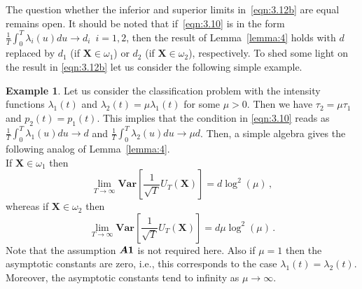 \documentclass[lettersize,journal,onecolumn]{IEEEtran}
\theoremstyle{definition}
\newtheorem{example}{Example}
\newcommand{\Var}[1]{\mathbf{Var}\left[#1\right]}
\newcommand{\assumption}[1]{{\rm \boldsymbol{A#1}}}
\begin{document}
The question whether the inferior and superior limits in~\eqref{eqn:3.12b} are equal
remains open. It should be noted that if~\eqref{eqn:3.10} is in the form \mbox{$
	\frac{1}{T}	\int_{0}^{T} \lambda_{i}(u)du \to d_{i}
	\enspace i=1,2
	$}, then the result of Lemma~\ref{lemma:4} holds with $d$ replaced by $d_{1}$
(if $\mathbf{X}\in\omega_{1}$) or $d_{2}$ (if $\mathbf{X}\in\omega_{2}$), respectively.
To shed some light on the result in \eqref{eqn:3.12b} let us consider the following
simple example.
\begin{example} 
	\label{example:1}
	Let us consider the classification problem with the intensity functions 
	$\lambda_1(t)$ and $\lambda_2(t) = \mu \lambda_1(t)$ for some $\mu > 0$. 
	Then we have $\tau_2 = \mu\tau_1$ and $p_2(t) = p_1(t)$. This implies that the 
	condition in \eqref{eqn:3.10} reads as \mbox{$
		\frac{1}{T}	\int_{0}^{T} \lambda_{1}(u)du \to d
		$}	and \mbox{$\frac{1}{T} \int_{0}^{T} \lambda_{2}(u)du \to \mu d$}. Then, a simple 
	algebra gives the following analog of Lemma~\ref{lemma:4}.\\
	If $\mathbf{X}\in\omega_{1}$ then
	\begin{equation}
		\lim_{T\to\infty} \Var{\frac{1}{\sqrt{T}}U_{T}\left(\mathbf{X}\right)} = 
		d \log^{2}(\mu)  
		\label{eqn:3.12c}\,,
	\end{equation}
	whereas if $\mathbf{X}\in\omega_{2}$ then
	\begin{equation}
		\lim_{T\to\infty} \Var{\frac{1}{\sqrt{T}}U_{T}\left(\mathbf{X}\right)} = 
		d \mu \log^{2}(\mu)
		\label{eqn:3.12d}\,.
	\end{equation}
	Note that the assumption $\assumption{1}$ is not required here. Also if 
	$\mu=1$ then the asymptotic constants are zero, i.e., this corresponds to the case
	$\lambda_1(t) = \lambda_2(t)$. Moreover, the asymptotic constants tend to infinity
	as $\mu \to \infty$.
\end{example}
\end{document}
